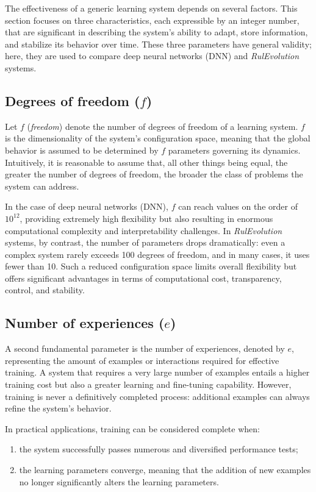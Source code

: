 \documentclass[12pt,a4paper]{article}
\begin{document}
The effectiveness of a generic learning system depends on several factors.  
This section focuses on three characteristics, each expressible by an integer number, that are significant in describing the system’s ability to adapt, store information, and stabilize its behavior over time.  
These three parameters have general validity; here, they are used to compare deep neural networks (DNN) and \textit{RulEvolution} systems.

\subsection{Degrees of freedom ($f$)}
Let $f$ (\textit{freedom}) denote the number of degrees of freedom of a learning system.  
$f$ is the dimensionality of the system’s configuration space, meaning that the global behavior is assumed to be determined by $f$ parameters governing its dynamics.  
Intuitively, it is reasonable to assume that, all other things being equal, the greater the number of degrees of freedom, the broader the class of problems the system can address.  

In the case of deep neural networks (DNN), $f$ can reach values on the order of $10^{12}$, providing extremely high flexibility but also resulting in enormous computational complexity and interpretability challenges.  
In \textit{RulEvolution} systems, by contrast, the number of parameters drops dramatically: even a complex system rarely exceeds 100 degrees of freedom, and in many cases, it uses fewer than 10.  
Such a reduced configuration space limits overall flexibility but offers significant advantages in terms of computational cost, transparency, control, and stability.  

\subsection{Number of experiences ($e$)}
A second fundamental parameter is the number of experiences, denoted by $e$, representing the amount of examples or interactions required for effective training.  
A system that requires a very large number of examples entails a higher training cost but also a greater learning and fine-tuning capability.  
However, training is never a definitively completed process: additional examples can always refine the system’s behavior.  

In practical applications, training can be considered complete when:
\begin{enumerate}[label=\alph*)]
    \item the system successfully passes numerous and diversified performance tests;
    \item the learning parameters converge, meaning that the addition of new examples no longer significantly alters the learning parameters.
\end{enumerate}
\end{document}
